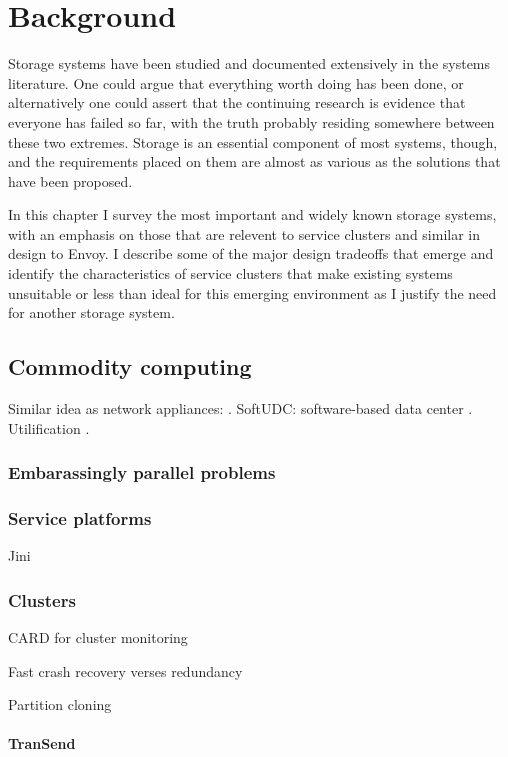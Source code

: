 \chapter{Background}

Storage systems have been studied and documented extensively in the systems literature. One could argue that everything worth doing has been done, or alternatively one could assert that the continuing research is evidence that everyone has failed so far, with the truth probably residing somewhere between these two extremes. Storage is an essential component of most systems, though, and the requirements placed on them are almost as various as the solutions that have been proposed.

In this chapter I survey the most important and widely known storage systems, with an emphasis on those that are relevent to service clusters and similar in design to Envoy. I describe some of the major design tradeoffs that emerge and identify the characteristics of service clusters that make existing systems unsuitable or less than ideal for this emerging environment as I justify the need for another storage system.

\section{Commodity computing}

Similar idea as network appliances: \cite{sapuntzakis03}. SoftUDC: software-based data center \cite{kallahalla}. Utilification \cite{wilkes04}.

\subsection{Embarassingly parallel problems}

\subsection{Service platforms}

Jini

\subsection{Clusters}
CARD for cluster monitoring\cite{anderson97}

Fast crash recovery verses redundancy\cite{baker94}

Partition cloning \cite{rauch}

\subsubsection{TranSend}

